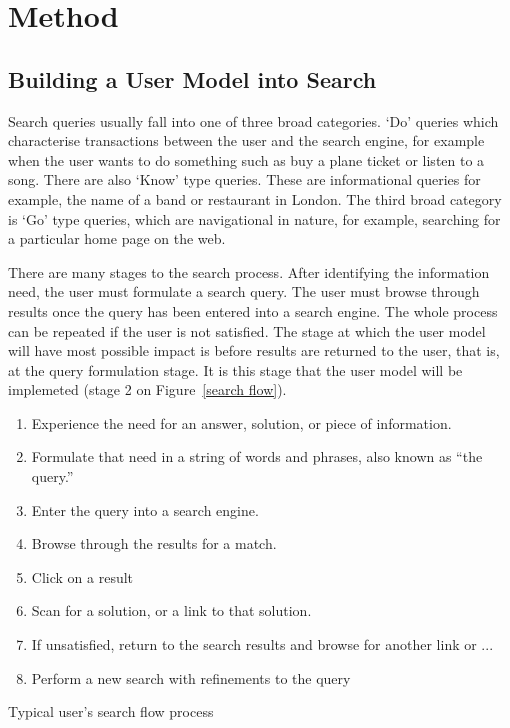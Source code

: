\documentclass[a4paper, 11pt]{article}
\begin{document}
\section {Method}
\subsection{Building a User Model into Search}\label{building the user model} 
Search queries usually fall into one of three broad categories.  `Do' queries which characterise transactions between the user and the search engine, for example when the user wants to do something such as buy a plane ticket or listen to a song. There are also `Know' type queries. These are informational queries for example, the name of a band or restaurant in London. The third broad category is `Go' type queries, which are navigational in nature, for example, searching for a particular home page on the web. 

There are many stages to the search process. After identifying the information need, the user must formulate a search query. The user must browse through results once the query has been entered into a search engine. The whole process can be repeated if the user is not satisfied. The stage at which the user model will have most possible impact is before results are returned to the user, that is, at the query formulation stage. It is this stage that the user model will be implemeted (stage 2 on Figure~\ref{search flow}).


\begin{center}
\begin{enumerate}
\item{Experience the need for an answer,
solution, or piece of information.}
\item{Formulate that need in a string of words and phrases, also known as “the query.”}
\item{Enter the query into a search engine.}
\item{Browse through the results for a match.}
\item{Click on a result}
\item{Scan for a solution, or a link to that solution.}
\item{If unsatisfied, return to the search results and browse for another link or ...}
\item{Perform a new search with refinements to the query}
\end {enumerate}
\label{search flow}

\hspace{1cm}
Typical user's search flow process \cite{seo}

\end{center}
\end{document}
